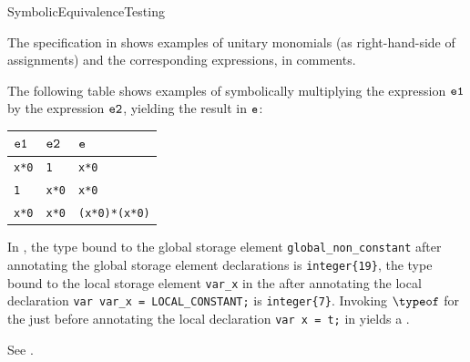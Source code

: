 \begin{TypingRuleList}{SymbolicEquivalenceTesting}

The specification in 
shows examples of unitary monomials (as right-hand-side of assignments)
and the corresponding expressions, in comments.




The following table shows examples of symbolically multiplying the expression $\texttt{e1}$ by the expression $\texttt{e2}$,
yielding the result in $\texttt{e}$:
\begin{center}
\begin{tabular}{lll}
\textbf{$\texttt{e1}$} & \textbf{$\texttt{e2}$} & \textbf{$\texttt{e}$}\\
\hline
\verb|x*0|  & \verb|1|    & \verb|x*0|\\
\verb|1|    & \verb|x*0|  & \verb|x*0|\\
\verb|x*0|  & \verb|x*0|  & \verb|(x*0)*(x*0)|
\end{tabular}
\end{center}




In , the type bound to the global storage element
\verb|global_non_constant| after annotating the global storage element declarations
is \verb|integer{19}|,
%
the type bound to the local storage element \verb|var_x| in the \staticenvironmentterm{}
after annotating the local declaration \verb|var var_x = LOCAL_CONSTANT;| is \verb|integer{7}|.
%
Invoking $\typeof$ for the \staticenvironmentterm{} just before annotating the local
declaration \verb|var x = t;| in  yields a \typingerrorterm.




See .



\end{TypingRuleList}
